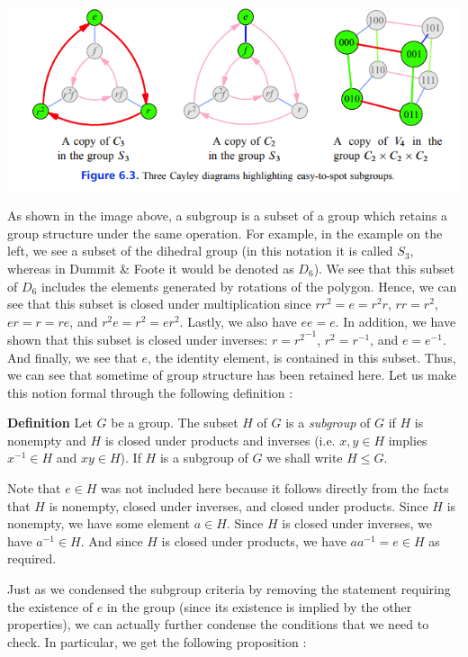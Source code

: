 \documentclass[11pt, reqno]{amsart}
\theoremstyle{plain}
\theoremstyle{definition}
\theoremstyle{example}
\begin{document}
\includegraphics[scale=1]{cayleysubgroup}

\par
As shown in the image above, a subgroup is a subset of a group which retains a group structure under the same operation. For example, in the example on the left, we see a subset of the dihedral group (in this notation it is called $S_3$, whereas in Dummit \& Foote it would be denoted as $D_6$). We see that this subset of $D_6$ includes the elements generated by rotations of the polygon. Hence, we can see that this subset is closed under multiplication since $rr^2 = e = r^2r$, $rr = r^2$, $er = r = re$, and $r^2e = r^2 = er^2$. Lastly, we also have $ee = e$. In addition, we have shown that this subset is closed under inverses: $r = {r^2}^{-1}$, $r^2 = r^{-1}$, and $e = e^{-1}$. And finally, we see that $e$, the identity element, is contained in this subset. Thus, we can see that sometime of group structure has been retained here. Let us make this notion formal through the following definition \cite[\S 2.1, p. 46]{dummit}:

\par
\textbf{Definition} Let $G$ be a group. The subset $H$ of $G$ is a \textit{subgroup} of $G$ if $H$ is nonempty and $H$ is closed under products and inverses (i.e. $x, y \in H$ implies $x^{-1} \in H$ and $xy \in H$). If $H$ is a subgroup of $G$ we shall write $H \le G$.

\par
Note that $e \in H$ was not included here because it follows directly from the facts that $H$ is nonempty, closed under inverses, and closed under products. Since $H$ is nonempty, we have some element $a \in H$. Since $H$ is closed under inverses, we have $a^{-1} \in H$. And since $H$ is closed under products, we have $aa^{-1} = e \in H$ as required.

\par
Just as we condensed the subgroup criteria by removing the statement requiring the existence of $e$ in the group (since its existence is implied by the other properties), we can actually further condense the conditions that we need to check. In particular, we get the following proposition \cite[\S 2.1, p. 47]{dummit}:
\end{document}
